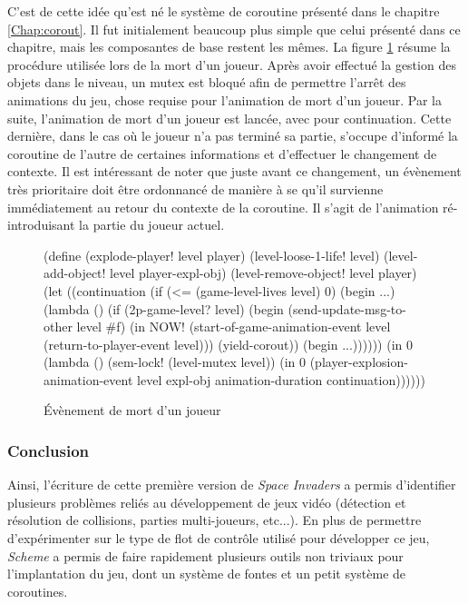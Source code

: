 \documentclass[12pt,twoside,letterpaper,francais]{book}
\newcommand{\si}{{\textit{Space Invaders }}}
\newcommand{\Schemelang}{{\textit{Scheme }}}
\newcommand{\scheme}[1]{\selectlanguage{english}{\tt #1}\selectlanguage{french}}
\begin{document}
C'est de cette idée qu'est né le système de coroutine présenté dans le
chapitre \ref{Chap:corout}. Il fut initialement beaucoup plus simple
que celui présenté dans ce chapitre, mais les composantes de base
restent les mêmes. La figure \ref{Exp:si-mort} résume la procédure
utilisée lors de la mort d'un joueur. Après avoir effectué la gestion
des objets dans le niveau, un mutex est bloqué afin de permettre
l'arrêt des animations du jeu, chose requise pour l'animation de mort
d'un joueur. Par la suite, l'animation de mort d'un joueur est lancée,
avec \scheme{continuation} pour continuation. Cette dernière, dans le
cas où le joueur n'a pas terminé sa partie, s'occupe d'informé la
coroutine de l'autre de certaines informations et d'effectuer le
changement de contexte. Il est intéressant de noter que juste avant ce
changement, un évènement très prioritaire doit être ordonnancé de
manière à se qu'il survienne immédiatement au retour du contexte de la
coroutine. Il s'agit de l'animation ré-introduisant la partie du
joueur actuel.\\

\begin{figure}[htb!]
  \begin{schemecode}
(define (explode-player! level player)
  (level-loose-1-life! level)
  (level-add-object! level player-expl-obj)
  (level-remove-object! level player)
  (let ((continuation
         (if (<= (game-level-lives level) 0)
             (begin ...)
             (lambda ()
               (if (2p-game-level? level)
                   (begin
                     (send-update-msg-to-other level \#f)
                     (in NOW! (start-of-game-animation-event
                               level (return-to-player-event level)))
                     (yield-corout))
                   (begin ...))))))
     (in 0 (lambda ()
            (sem-lock! (level-mutex level))
            (in 0 (player-explosion-animation-event
                   level expl-obj animation-duration continuation))))))
   \end{schemecode}
  \caption{Évènement de mort d'un joueur}
  \label{Exp:si-mort}
\end{figure}


\FloatBarrier
\subsubsection{Conclusion}
Ainsi, l'écriture de cette première version de \si a permis
d'identifier plusieurs problèmes reliés au développement de jeux vidéo
(détection et résolution de collisions, parties multi-joueurs,
etc...). En plus de permettre d'expérimenter sur le type de flot de
contrôle utilisé pour développer ce jeu, \Schemelang a permis de faire
rapidement plusieurs outils non triviaux pour l'implantation du jeu,
dont un système de fontes et un petit système de coroutines.
\end{document}
